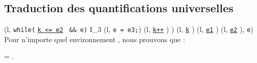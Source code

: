 \subsection{Traduction des quantifications universelles}

{
  {
     {
       {
        \cdot
          (l, \mbox{\lstinline'while('}
          \underline{\mbox{\lstinline'k <= e2'}}~ \mbox{\lstinline'&& e)'}
          \bopen
          I_3
          \cdot (l, \mbox{\lstinline'e = e3;'})
          \cdot (l, \underline{\mbox{\lstinline'k++'}} \semicolon)
          \bclose )
        \cdot
          (l, \underline{\mbox{\lstinline'k'}} \Zclear \semicolon )
        \cdot
          (l, \underline{\mbox{\lstinline'e1'}} \Zclear \semicolon )
        \cdot
          (l, \underline{\mbox{\lstinline'e2'}} \Zclear \semicolon ),
        \mbox{\lstinline'e'})
      }
    }
  }
}~\\


Pour n'importe quel environnement \env, nous prouvons que :

 =
.


